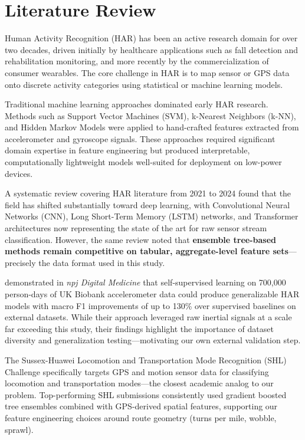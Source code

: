 \documentclass[11pt, onecolumn]{article}
\begin{document}
\section{Literature Review}

Human Activity Recognition (HAR) has been an active research domain for over two decades, driven initially by healthcare applications such as fall detection and rehabilitation monitoring, and more recently by the commercialization of consumer wearables. The core challenge in HAR is to map sensor or GPS data onto discrete activity categories using statistical or machine learning models.

Traditional machine learning approaches dominated early HAR research. Methods such as Support Vector Machines (SVM), k-Nearest Neighbors (k-NN), and Hidden Markov Models were applied to hand-crafted features extracted from accelerometer and gyroscope signals. These approaches required significant domain expertise in feature engineering but produced interpretable, computationally lightweight models well-suited for deployment on low-power devices.

A systematic review covering HAR literature from 2021 to 2024 \citep{islam2025} found that the field has shifted substantially toward deep learning, with Convolutional Neural Networks (CNN), Long Short-Term Memory (LSTM) networks, and Transformer architectures now representing the state of the art for raw sensor stream classification. However, the same review noted that \textbf{ensemble tree-based methods remain competitive on tabular, aggregate-level feature sets}---precisely the data format used in this study.

\citet{yuan2024} demonstrated in \textit{npj Digital Medicine} that self-supervised learning on 700,000 person-days of UK Biobank accelerometer data could produce generalizable HAR models with macro F1 improvements of up to 130\% over supervised baselines on external datasets. While their approach leveraged raw inertial signals at a scale far exceeding this study, their findings highlight the importance of dataset diversity and generalization testing---motivating our own external validation step.

The Sussex-Huawei Locomotion and Transportation Mode Recognition (SHL) Challenge \citep{wang2023shl} specifically targets GPS and motion sensor data for classifying locomotion and transportation modes---the closest academic analog to our problem. Top-performing SHL submissions consistently used gradient boosted tree ensembles combined with GPS-derived spatial features, supporting our feature engineering choices around route geometry (turns per mile, wobble, sprawl).
\end{document}
